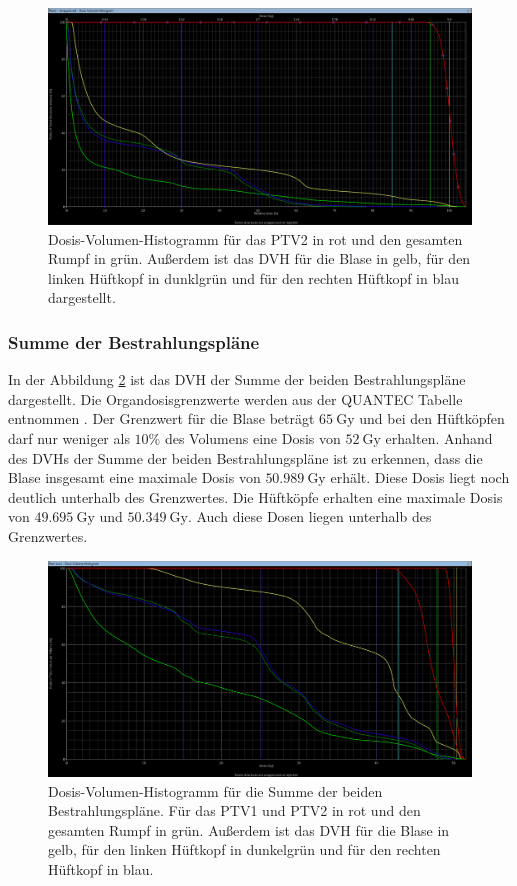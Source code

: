 \begin{figure}[H]
  \centering
  \includegraphics[width=\textwidth]{Bilder/Rektum2_DVH.png}
  \caption{Dosis-Volumen-Histogramm für das PTV2 in rot und den gesamten Rumpf in grün. Außerdem ist das DVH für die Blase in gelb, für den linken Hüftkopf in dunklgrün und für den rechten Hüftkopf in blau dargestellt.}
  \label{abb:DVH2}
\end{figure}

\subsubsection*{Summe der Bestrahlungspläne}

In der Abbildung \ref{abb:DVHsum} ist das DVH der Summe der beiden Bestrahlungspläne dargestellt.
Die Organdosisgrenzwerte werden aus der QUANTEC Tabelle entnommen \cite{QUANTEC}. Der Grenzwert für die
Blase beträgt $\SI{65}{\gray}$ und bei den Hüftköpfen darf nur weniger als $10\%$ des Volumens eine Dosis von $\SI{52}{\gray}$ erhalten.
Anhand des DVHs der Summe
der beiden Bestrahlungspläne ist zu erkennen, dass die Blase insgesamt eine maximale Dosis von
$\SI{50.989}{\gray}$ erhält. Diese Dosis liegt noch deutlich unterhalb des Grenzwertes.
Die Hüftköpfe erhalten eine maximale Dosis von $\SI{49.695}{\gray}$ und $\SI{50.349}{\gray}$.
Auch diese Dosen liegen unterhalb des Grenzwertes.

\begin{figure}[H]
  \centering
  \includegraphics[width=\textwidth]{Bilder/Rektum_summe.png}
  \caption{Dosis-Volumen-Histogramm für die Summe der beiden Bestrahlungspläne. Für das PTV1 und PTV2 in rot und den gesamten Rumpf in grün. Außerdem ist das DVH für die Blase in gelb, für den linken Hüftkopf in dunkelgrün und für den rechten Hüftkopf in blau.}
  \label{abb:DVHsum}
\end{figure}

